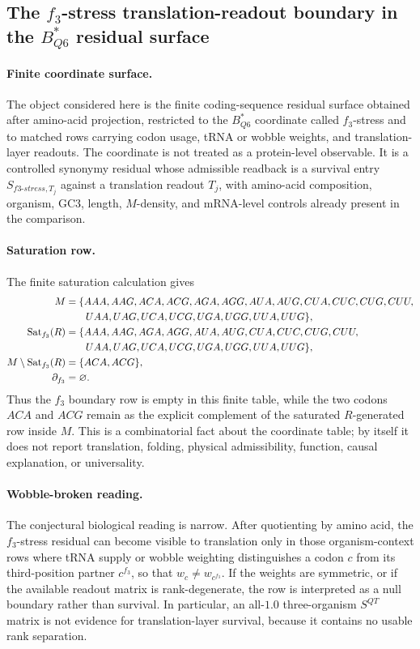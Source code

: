 \subsection{The $f_3$-stress translation-readout boundary in the $B^{*}_{Q6}$ residual surface}\label{subsec:q6-f3-stress-wobble-broken-translation-readout-cross-layer}

\paragraph{Finite coordinate surface.}
The object considered here is the finite coding-sequence residual surface obtained after amino-acid projection, restricted to the $B^{*}_{Q6}$ coordinate called $f_3$-stress and to matched rows carrying codon usage, tRNA or wobble weights, and translation-layer readouts. The coordinate is not treated as a protein-level observable. It is a controlled synonymy residual whose admissible readback is a survival entry $S_{f3\text{-}stress,T_j}$ against a translation readout $T_j$, with amino-acid composition, organism, GC3, length, $M$-density, and mRNA-level controls already present in the comparison.

\paragraph{Saturation row.}
The finite saturation calculation gives
$$
\begin{aligned}
M&=\{AAA,AAG,ACA,ACG,AGA,AGG,AUA,AUG,CUA,CUC,CUG,CUU,\notag\\
&\qquad UAA,UAG,UCA,UCG,UGA,UGG,UUA,UUG\},\\
\operatorname{Sat}_{f_3}(R)&=\{AAA,AAG,AGA,AGG,AUA,AUG,CUA,CUC,CUG,CUU,\notag\\
&\qquad UAA,UAG,UCA,UCG,UGA,UGG,UUA,UUG\},\\
M\setminus \operatorname{Sat}_{f_3}(R)&=\{ACA,ACG\},\\
\partial_{f_3}&=\varnothing.
\end{aligned}
$$
Thus the $f_3$ boundary row is empty in this finite table, while the two codons $ACA$ and $ACG$ remain as the explicit complement of the saturated $R$-generated row inside $M$. This is a combinatorial fact about the coordinate table; by itself it does not report translation, folding, physical admissibility, function, causal explanation, or universality.

\paragraph{Wobble-broken reading.}
The conjectural biological reading is narrow. After quotienting by amino acid, the $f_3$-stress residual can become visible to translation only in those organism-context rows where tRNA supply or wobble weighting distinguishes a codon $c$ from its third-position partner $c^{f_3}$, so that $w_c\neq w_{c^{f_3}}$. If the weights are symmetric, or if the available readout matrix is rank-degenerate, the row is interpreted as a null boundary rather than survival. In particular, an all-$1.0$ three-organism $S^{QT}$ matrix is not evidence for translation-layer survival, because it contains no usable rank separation.

